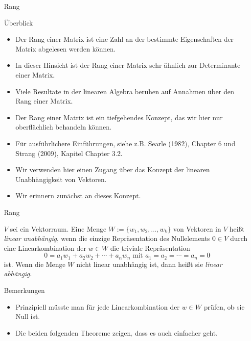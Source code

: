\documentclass[
  8pt,
  ignorenonframetext,
]{beamer}
\providecommand{\tightlist}{%
  \setlength{\itemsep}{0pt}\setlength{\parskip}{0pt}}
\begin{document}
\begin{frame}{Rang}
\protect\hypertarget{rang}{}
\small

Überblick

\footnotesize
{}

\begin{itemize}
\tightlist
\item
  Der Rang einer Matrix ist eine Zahl an der bestimmte Eigenschaften der
  Matrix abgelesen werden können.
\item
  In dieser Hinsicht ist der Rang einer Matrix sehr ähnlich zur
  Determinante einer Matrix.
\item
  Viele Resultate in der linearen Algebra beruhen auf Annahmen über den
  Rang einer Matrix.
\item
  Der Rang einer Matrix ist ein tiefgehendes Konzept, das wir hier nur
  oberflächlich behandeln können.
\item
  Für ausführlichere Einführungen, siehe z.B. Searle (1982), Chapter 6
  und Strang (2009), Kapitel Chapter 3.2.
\item
  Wir verwenden hier einen Zugang über das Konzept der linearen
  Unabhängigkeit von Vektoren.
\item
  Wir erinnern zunächst an dieses Konzept.
\end{itemize}
\end{frame}

\begin{frame}{Rang}
\protect\hypertarget{rang-1}{}
\small
\begin{definition}
\justifying
$V$ sei ein Vektorraum. Eine Menge $W := \{w_1, w_2, ...,w_k\}$ von Vektoren in $V$ heißt
\textit{linear unabhängig}, wenn die einzige Repräsentation des Nullelements
$0 \in V$ durch eine Linearkombination der $w \in W$ die triviale
Repräsentation
\begin{equation}
0 = a_1 w_1 + a_2 w_2 + \cdots + a_n w_n \mbox{ mit } a_1 = a_2 =  \cdots = a_n = 0
\end{equation}
ist. Wenn die Menge $W$ nicht linear unabhängig ist, dann heißt sie \textit{linear abhängig}.
\end{definition}

Bemerkungen

\begin{itemize}
\tightlist
\item
  Prinzipiell müsste man für jede Linearkombination der \(w \in W\)
  prüfen, ob sie Null ist.
\item
  Die beiden folgenden Theoreme zeigen, dass es auch einfacher geht.
\end{itemize}
\end{frame}
\end{document}
